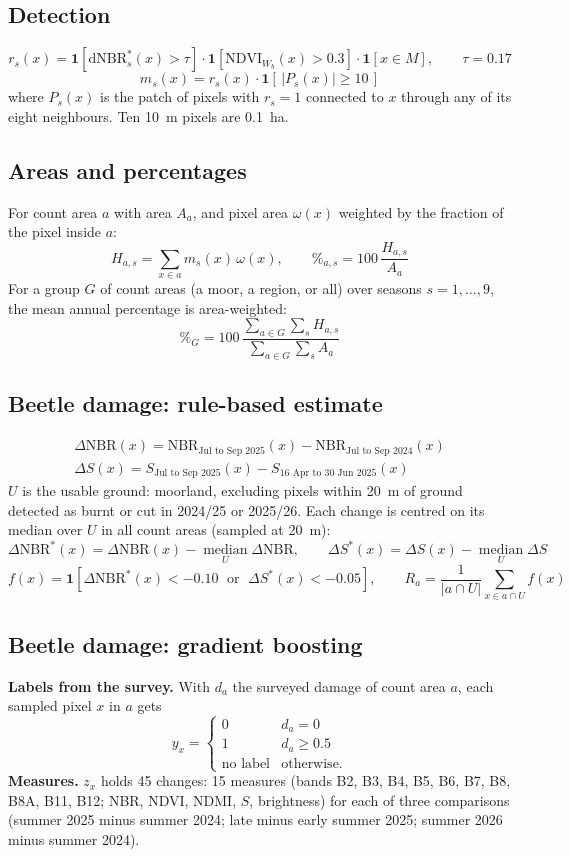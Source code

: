 \documentclass[11pt,a4paper]{article}
\begin{document}
\subsection{Detection}
\[
r_s(x) = \mathbf{1}\!\left[\mathrm{dNBR}^{*}_s(x) > \tau\right]\cdot \mathbf{1}\!\left[\mathrm{NDVI}_{W_b}(x) > 0.3\right]\cdot \mathbf{1}\!\left[x \in M\right], \qquad \tau = 0.17
\]
\[
m_s(x) = r_s(x)\cdot \mathbf{1}\!\left[\,|P_s(x)| \ge 10\,\right]
\]
where $P_s(x)$ is the patch of pixels with $r_s = 1$ connected to $x$ through any of its eight neighbours. Ten 10~m pixels are 0.1~ha.

\subsection{Areas and percentages}
For count area $a$ with area $A_a$, and pixel area $\omega(x)$ weighted by the fraction of the pixel inside $a$:
\[
H_{a,s} = \sum_{x \in a} m_s(x)\,\omega(x), \qquad \%_{a,s} = 100\,\frac{H_{a,s}}{A_a}
\]
For a group $G$ of count areas (a moor, a region, or all) over seasons $s = 1,\dots,9$, the mean annual percentage is area-weighted:
\[
\%_G = 100\,\frac{\sum_{a\in G}\sum_s H_{a,s}}{\sum_{a\in G}\sum_s A_a}
\]

\subsection{Beetle damage: rule-based estimate}
\begin{gather*}
\Delta\mathrm{NBR}(x) = \mathrm{NBR}_{\text{Jul to Sep 2025}}(x) - \mathrm{NBR}_{\text{Jul to Sep 2024}}(x) \\
\Delta S(x) = S_{\text{Jul to Sep 2025}}(x) - S_{\text{16 Apr to 30 Jun 2025}}(x)
\end{gather*}
$U$ is the usable ground: moorland, excluding pixels within 20~m of ground detected as burnt or cut in 2024/25 or 2025/26. Each change is centred on its median over $U$ in all count areas (sampled at 20~m):
\[
\Delta\mathrm{NBR}^{*}(x) = \Delta\mathrm{NBR}(x) - \operatorname*{median}_{U}\Delta\mathrm{NBR}, \qquad \Delta S^{*}(x) = \Delta S(x) - \operatorname*{median}_{U}\Delta S
\]
\[
f(x) = \mathbf{1}\!\left[\Delta\mathrm{NBR}^{*}(x) < -0.10 \;\text{ or }\; \Delta S^{*}(x) < -0.05\right], \qquad R_a = \frac{1}{|a\cap U|}\sum_{x\in a\cap U} f(x)
\]

\subsection{Beetle damage: gradient boosting}
\textbf{Labels from the survey.} With $d_a$ the surveyed damage of count area $a$, each sampled pixel $x$ in $a$ gets
\[
y_x = \begin{cases}0 & d_a = 0\\ 1 & d_a \ge 0.5\\ \text{no label} & \text{otherwise.}\end{cases}
\]
\textbf{Measures.} $z_x$ holds 45 changes: 15 measures (bands B2, B3, B4, B5, B6, B7, B8, B8A, B11, B12; NBR, NDVI, NDMI, $S$, brightness) for each of three comparisons (summer 2025 minus summer 2024; late minus early summer 2025; summer 2026 minus summer 2024).
\end{document}
